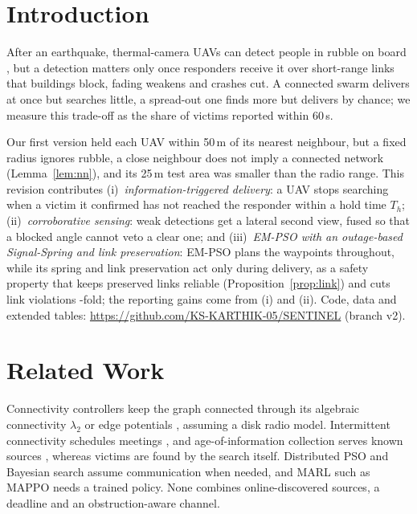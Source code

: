 \documentclass{IOS-Book-Article}
\newif\ifhighlight
\newenvironment{revised}{\ifhighlight\color{blue}\fi}{}
\newcommand{\kept}[1]{{\color{black}#1}}
\begin{document}
\section{\kept{Introduction}}
\begin{revised}
After an earthquake, thermal-camera UAVs can detect people in rubble on board \cite{hituav,yolo26},
but a detection matters only once responders receive it over short-range links that buildings block,
fading weakens and crashes cut. A connected swarm delivers at once but searches little, a spread-out
one finds more but delivers by chance; we measure this trade-off as the share of victims reported
within 60\,s.

Our first version held each UAV within 50\,m of its nearest neighbour, but a fixed radius ignores
rubble, a close neighbour does not imply a connected network (Lemma~\ref{lem:nn}), and its 25\,m test
area was smaller than the radio range. This revision contributes (i)~\emph{information-triggered
delivery}: a UAV stops searching when a victim it confirmed has not reached the responder within a hold
time $T_h$; (ii)~\emph{corroborative sensing}: weak detections get a lateral second view, fused so that
a blocked angle cannot veto a clear one; and (iii)~\emph{EM-PSO with an outage-based Signal-Spring and
link preservation}: EM-PSO plans the waypoints throughout, while its spring and link preservation act
only during delivery, as a safety property that keeps preserved links reliable
(Proposition~\ref{prop:link}) and cuts link violations \nViolFold-fold; the reporting gains come from
(i) and (ii). Code, data and extended tables: \url{https://github.com/KS-KARTHIK-05/SENTINEL} (branch v2).
\end{revised}

\section{\kept{Related Work}}
\begin{revised}
Connectivity controllers keep the graph connected through its algebraic connectivity
$\lambda_2$ \cite{zavlanos2008,sabattini2013} or edge potentials \cite{ji2007}, assuming a disk radio model. Intermittent connectivity schedules meetings
\cite{kantaros2017}, and age-of-information collection serves known sources
\cite{bafarassat2026aoi}, whereas victims are found by the search itself. Distributed PSO and Bayesian
search \cite{yang2024dapso,niu2026eventbayes} assume communication when needed, and MARL such as
MAPPO \cite{yu2022mappo} needs a trained policy. None combines
online-discovered sources, a deadline and an obstruction-aware channel.
\end{revised}
\end{document}
